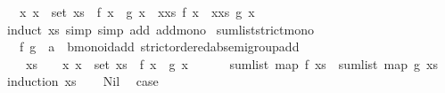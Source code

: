 \begin{isabellebody}
\ \ \ {\isachardoublequoteopen}{\isacharparenleft}{\kern0pt}{\isasymAnd}x{\isachardot}{\kern0pt}\ x\ {\isasymin}\ set\ xs\ {\isasymLongrightarrow}\ f\ x\ {\isasymle}\ g\ x{\isacharparenright}{\kern0pt}\ {\isasymLongrightarrow}\ {\isacharparenleft}{\kern0pt}{\isasymSum}x{\isasymleftarrow}xs{\isachardot}{\kern0pt}\ f\ x{\isacharparenright}{\kern0pt}\ {\isasymle}\ {\isacharparenleft}{\kern0pt}{\isasymSum}x{\isasymleftarrow}xs{\isachardot}{\kern0pt}\ g\ x{\isacharparenright}{\kern0pt}{\isachardoublequoteclose}\isanewline
%
\isadelimproof
%
\endisadelimproof
%
\isatagproof
{}\isamarkupfalse%
\ {\isacharparenleft}{\kern0pt}induct\ xs{\isacharparenright}{\kern0pt}\ {\isacharparenleft}{\kern0pt}simp{\isacharcomma}{\kern0pt}\ simp\ add{\isacharcolon}{\kern0pt}\ add{\isacharunderscore}{\kern0pt}mono{\isacharparenright}{\kern0pt}%
\endisatagproof
{\isafoldproof}%
%
\isadelimproof
\isanewline
%
\endisadelimproof
\isanewline
{}\isamarkupfalse%
\ sum{\isacharunderscore}{\kern0pt}list{\isacharunderscore}{\kern0pt}strict{\isacharunderscore}{\kern0pt}mono{\isacharcolon}{\kern0pt}\isanewline
\ \ \ f\ g\ {\isacharcolon}{\kern0pt}{\isacharcolon}{\kern0pt}\ {\isachardoublequoteopen}{\isacharprime}{\kern0pt}a\ {\isasymRightarrow}\ {\isacharprime}{\kern0pt}b{\isacharcolon}{\kern0pt}{\isacharcolon}{\kern0pt}{\isacharbraceleft}{\kern0pt}monoid{\isacharunderscore}{\kern0pt}add{\isacharcomma}{\kern0pt}\ strict{\isacharunderscore}{\kern0pt}ordered{\isacharunderscore}{\kern0pt}ab{\isacharunderscore}{\kern0pt}semigroup{\isacharunderscore}{\kern0pt}add{\isacharbraceright}{\kern0pt}{\isachardoublequoteclose}\isanewline
\ \ \ {\isachardoublequoteopen}{\isasymlbrakk}\ xs\ {\isasymnoteq}\ {\isacharbrackleft}{\kern0pt}{\isacharbrackright}{\kern0pt}{\isacharsemicolon}{\kern0pt}\ \ {\isasymAnd}x{\isachardot}{\kern0pt}\ x\ {\isasymin}\ set\ xs\ {\isasymLongrightarrow}\ f\ x\ {\isacharless}{\kern0pt}\ g\ x\ {\isasymrbrakk}\isanewline
\ \ \ \ {\isasymLongrightarrow}\ sum{\isacharunderscore}{\kern0pt}list\ {\isacharparenleft}{\kern0pt}map\ f\ xs{\isacharparenright}{\kern0pt}\ {\isacharless}{\kern0pt}\ sum{\isacharunderscore}{\kern0pt}list\ {\isacharparenleft}{\kern0pt}map\ g\ xs{\isacharparenright}{\kern0pt}{\isachardoublequoteclose}\isanewline
%
\isadelimproof
%
\endisadelimproof
%
\isatagproof
{}\isamarkupfalse%
\ {\isacharparenleft}{\kern0pt}induction\ xs{\isacharparenright}{\kern0pt}\isanewline
\ \ \isamarkupfalse%
\ Nil\ \isamarkupfalse%
\ {\isacharquery}{\kern0pt}case\ \isamarkupfalse%

\end{isabellebody}

